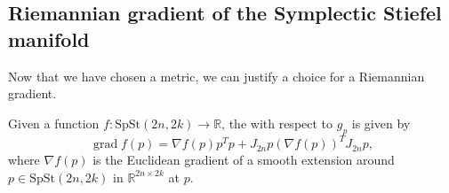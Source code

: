 \subsection{Riemannian gradient of the Symplectic Stiefel manifold}
Now that we have chosen a metric, we can justify a choice for a Riemannian gradient. 
\begin{proposition}
    Given a function $f:\mathrm{SpSt}(2n, 2k)\xrightarrow{}\mathbb{R}$, the  with respect to $g_{p}$ is given by
    \begin{equation}\label{eq:rie_grad}
        \operatorname{grad}f(p)=\nabla f(p)p^{T}p+J_{2n}p(\nabla f(p))^{T}J_{2n}p,
    \end{equation}
    where $\nabla f(p)$ is the Euclidean gradient of a smooth extension around $p\in \mathrm{SpSt}(2n, 2k)$ in $\mathbb{R}^{2n\times2k}$ at $p$.
\end{proposition}
